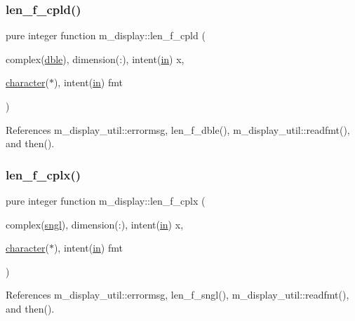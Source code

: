 \subsubsection{\texorpdfstring{len\+\_\+f\+\_\+cpld()}{len\_f\_cpld()}}
{\footnotesize\ttfamily pure integer function m\+\_\+display\+::len\+\_\+f\+\_\+cpld (\begin{DoxyParamCaption}\item[{complex(\hyperlink{namespacem__display_a46d90b75b6ccef7ccade133e5847e815}{dble}), dimension(\+:), intent(\hyperlink{M__journal_83_8txt_afce72651d1eed785a2132bee863b2f38}{in})}]{x,  }\item[{\hyperlink{option__stopwatch_83_8txt_abd4b21fbbd175834027b5224bfe97e66}{character}($\ast$), intent(\hyperlink{M__journal_83_8txt_afce72651d1eed785a2132bee863b2f38}{in})}]{fmt }\end{DoxyParamCaption})\hspace{0.3cm}{\ttfamily [private]}}



References m\+\_\+display\+\_\+util\+::errormsg, len\+\_\+f\+\_\+dble(), m\+\_\+display\+\_\+util\+::readfmt(), and then().

\mbox{\label{namespacem__display_a37f268a7276f14d4975200a8f83acff3}} 
\subsubsection{\texorpdfstring{len\+\_\+f\+\_\+cplx()}{len\_f\_cplx()}}
{\footnotesize\ttfamily pure integer function m\+\_\+display\+::len\+\_\+f\+\_\+cplx (\begin{DoxyParamCaption}\item[{complex(\hyperlink{namespacem__display_a2ac86bc535c3ccc5947dbb3109c666b5}{sngl}), dimension(\+:), intent(\hyperlink{M__journal_83_8txt_afce72651d1eed785a2132bee863b2f38}{in})}]{x,  }\item[{\hyperlink{option__stopwatch_83_8txt_abd4b21fbbd175834027b5224bfe97e66}{character}($\ast$), intent(\hyperlink{M__journal_83_8txt_afce72651d1eed785a2132bee863b2f38}{in})}]{fmt }\end{DoxyParamCaption})\hspace{0.3cm}{\ttfamily [private]}}



References m\+\_\+display\+\_\+util\+::errormsg, len\+\_\+f\+\_\+sngl(), m\+\_\+display\+\_\+util\+::readfmt(), and then().


